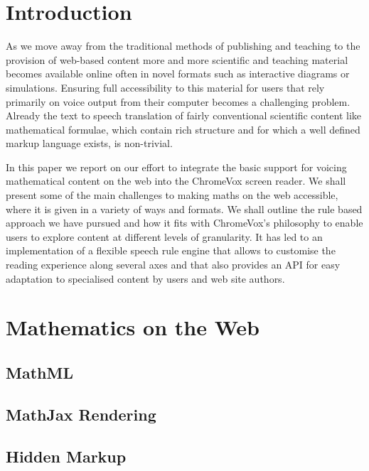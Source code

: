 \documentclass{sig-alternate}
\begin{document}
\terms{}

\keywords{}

\section{Introduction}\label{sec:intro}
As we move away from the traditional methods of publishing and
teaching to the provision of web-based content more and more
scientific and teaching material becomes available online often in
novel formats such as interactive diagrams or simulations. Ensuring
full accessibility to this material for users that rely primarily on
voice output from their computer becomes a challenging
problem. Already the text to speech translation of fairly conventional
scientific content like mathematical formulae, which contain rich
structure and for which a well defined markup language exists, is
non-trivial.


In this paper we report on our effort to integrate the basic support
for voicing mathematical content on the web into the ChromeVox screen
reader. We shall present some of the main challenges to making maths
on the web accessible, where it is given in a variety of ways and
formats. We shall outline the rule based approach we have pursued and
how it fits with ChromeVox's philosophy to enable users to explore
content at different levels of granularity. It has led to an
implementation of a flexible speech rule engine that allows to
customise the reading experience along several axes and that also
provides an API for easy adaptation to specialised content by users
and web site authors.

\section{Mathematics on the Web}
\label{sec:math}

\subsection{MathML}
\label{sec:mathml}

\subsection{MathJax Rendering}
\label{sec:mathjax}

\subsection{Hidden Markup}
\label{sec:images}
\end{document}
